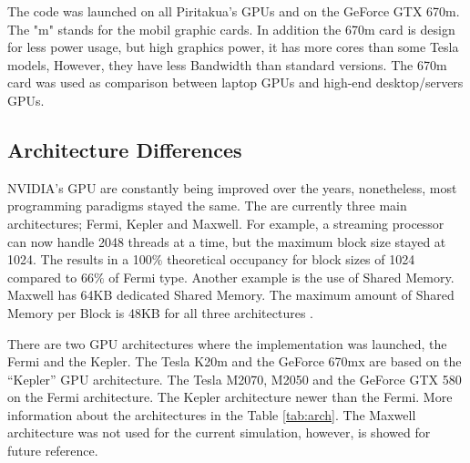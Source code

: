   The code was launched on all Piritakua's GPUs and on the GeForce GTX 670m. The "m" stands for the mobil graphic cards. In addition the 670m card is design for less power usage, but high graphics power, it has more cores than some Tesla models, However, they have less Bandwidth than standard versions. The 670m card was used as comparison between laptop GPUs and high-end desktop/servers GPUs.
     
\subsection{Architecture Differences}

  NVIDIA's GPU are constantly being improved over the years, nonetheless, most programming paradigms stayed the same. The are currently three main architectures; Fermi, Kepler and Maxwell. For example, a streaming processor can now handle 2048 threads at a time, but the maximum block size stayed at 1024. The results in a 100$\%$ theoretical occupancy for block sizes of 1024 compared to 66$\%$ of Fermi type. Another example is the use of Shared Memory. Maxwell has 64KB dedicated Shared Memory. The maximum amount of Shared Memory per Block is 48KB for all three architectures \cite{hoermanngpu}.
  
  There are two GPU architectures where the implementation was launched, the Fermi and the Kepler. The Tesla K20m and the GeForce 670mx are based on the ``Kepler'' GPU architecture. The Tesla M2070, M2050 and the GeForce GTX 580 on the Fermi architecture. The Kepler architecture newer than the Fermi. More information about the architectures in the Table \ref{tab:arch}. The Maxwell architecture was not used for the current simulation, however, is showed for future reference.
  
